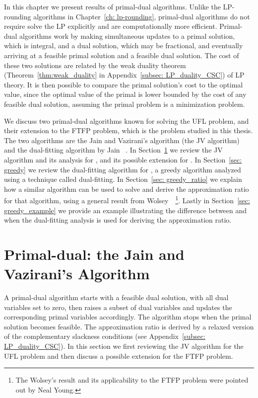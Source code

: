 \documentclass[oneside,final]{ucr}
\begin{document}
In this chapter we present results of primal-dual
algorithms. Unlike the LP-rounding algorithms in
Chapter~\ref{ch: lp-rounding}, primal-dual algorithms do not
require solve the LP explicitly and are computationally more
efficient. Primal-dual algorithms work by making
simultaneous updates to a primal solution, which is
integral, and a dual solution, which may be fractional, and
eventually arriving at a feasible primal solution and a
feasible dual solution. The cost of these two solutions are
related by the weak duality theorem
(Theorem~\ref{thm:weak_duality} in Appendix~\ref{subsec:
  LP_duality_CSC}) of LP theory. It is then possible to
compare the primal solution's cost to the optimal value,
since the optimal value of the primal is lower bounded by
the cost of any feasible dual solution, assuming the primal
problem is a minimization problem.

We discuss two primal-dual algorithms known for solving the
UFL problem, and their extension to the FTFP problem, which
is the problem studied in this thesis. The two algorithms
are the Jain and Vazirani's algorithm (the JV
algorithm)~\cite{JainV01} and the dual-fitting algorithm by
Jain {\etal}~\cite{JainMMSV03}. In Section~\ref{sec: JV} we
review the JV algorithm and its analysis for {\UFL}, and its
possible extension for {\FTFP}. In Section~\ref{sec: greedy}
we review the dual-fitting algorithm for {\UFL}, a greedy
algorithm analyzed using a technique called dual-fitting.
In Section~\ref{sec: greedy_ratio} we explain how a similar
algorithm can be used to solve {\FTFP} and derive the
approximation ratio for that algorithm, using a general
result from Wolsey~\cite{Wolsey88}~\footnote{The Wolsey's
  result and its applicability to the FTFP problem were
  pointed out by Neal Young.}. Lastly in Section~\ref{sec:
  greedy_example} we provide an example illustrating the
difference between {\UFL} and {\FTFP} when the dual-fitting
analysis is used for deriving the approximation ratio.

\section{Primal-dual: the Jain and Vazirani's Algorithm}
\label{sec: JV}
A primal-dual algorithm starts with a feasible dual
solution, with all dual variables set to zero, then raises a
subset of dual variables and updates the corresponding
primal variables accordingly. The algorithm stops when the
primal solution becomes feasible. The approximation ratio is
derived by a relaxed version of the complementary slackness
conditions (see Appendix~\ref{subsec: LP_duality_CSC}). In
this section we first reviewing the JV algorithm for the UFL
problem and then discuss a possible extension for the FTFP
problem.
\end{document}

